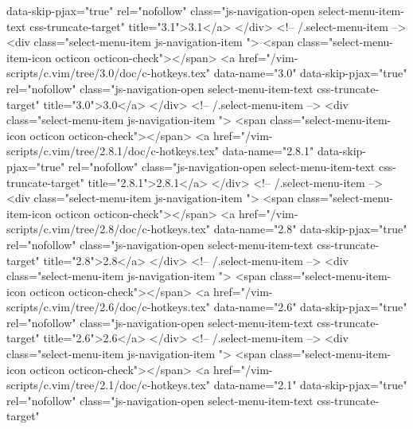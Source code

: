                  data-skip-pjax="true"
                 rel="nofollow"
                 class="js-navigation-open select-menu-item-text css-truncate-target"
                 title="3.1">3.1</a>
            </div> <!-- /.select-menu-item -->
            <div class="select-menu-item js-navigation-item ">
              <span class="select-menu-item-icon octicon octicon-check"></span>
              <a href="/vim-scripts/c.vim/tree/3.0/doc/c-hotkeys.tex"
                 data-name="3.0"
                 data-skip-pjax="true"
                 rel="nofollow"
                 class="js-navigation-open select-menu-item-text css-truncate-target"
                 title="3.0">3.0</a>
            </div> <!-- /.select-menu-item -->
            <div class="select-menu-item js-navigation-item ">
              <span class="select-menu-item-icon octicon octicon-check"></span>
              <a href="/vim-scripts/c.vim/tree/2.8.1/doc/c-hotkeys.tex"
                 data-name="2.8.1"
                 data-skip-pjax="true"
                 rel="nofollow"
                 class="js-navigation-open select-menu-item-text css-truncate-target"
                 title="2.8.1">2.8.1</a>
            </div> <!-- /.select-menu-item -->
            <div class="select-menu-item js-navigation-item ">
              <span class="select-menu-item-icon octicon octicon-check"></span>
              <a href="/vim-scripts/c.vim/tree/2.8/doc/c-hotkeys.tex"
                 data-name="2.8"
                 data-skip-pjax="true"
                 rel="nofollow"
                 class="js-navigation-open select-menu-item-text css-truncate-target"
                 title="2.8">2.8</a>
            </div> <!-- /.select-menu-item -->
            <div class="select-menu-item js-navigation-item ">
              <span class="select-menu-item-icon octicon octicon-check"></span>
              <a href="/vim-scripts/c.vim/tree/2.6/doc/c-hotkeys.tex"
                 data-name="2.6"
                 data-skip-pjax="true"
                 rel="nofollow"
                 class="js-navigation-open select-menu-item-text css-truncate-target"
                 title="2.6">2.6</a>
            </div> <!-- /.select-menu-item -->
            <div class="select-menu-item js-navigation-item ">
              <span class="select-menu-item-icon octicon octicon-check"></span>
              <a href="/vim-scripts/c.vim/tree/2.1/doc/c-hotkeys.tex"
                 data-name="2.1"
                 data-skip-pjax="true"
                 rel="nofollow"
                 class="js-navigation-open select-menu-item-text css-truncate-target"
